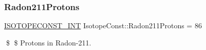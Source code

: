 \subsubsection{\texorpdfstring{Radon211\+Protons}{Radon211Protons}}
{\footnotesize\ttfamily \mbox{\hyperlink{group___isotope_const-_macros_ga5f18360b3e99483a35c32d789e62621c}{I\+S\+O\+T\+O\+P\+E\+C\+O\+N\+S\+T\+\_\+\+I\+NT}} Isotope\+Const\+::\+Radon211\+Protons = 86}

\$ \$ Protons in Radon-\/211. 